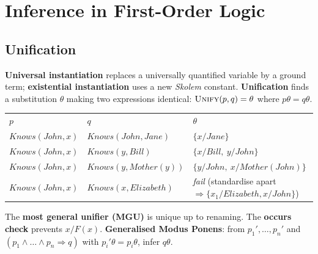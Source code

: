 \section{Inference in First-Order Logic}
\subsection{Unification}
\textbf{Universal instantiation} replaces a universally quantified variable by a ground term; \textbf{existential instantiation} uses a new \emph{Skolem} constant. \textbf{Unification} finds a substitution $\theta$ making two expressions identical: $\textsc{Unify}(p,q)=\theta$ where $p\theta=q\theta$.
\begin{center}\small
\begin{tabular}{lll}
\rowcolor{navy}\color{gold}$p$&\color{gold}$q$&\color{gold}$\theta$\\
$\textit{Knows}(John,x)$&$\textit{Knows}(John,Jane)$&$\{x/Jane\}$\\
\rowcolor{ivory}$\textit{Knows}(John,x)$&$\textit{Knows}(y,Bill)$&$\{x/Bill,\ y/John\}$\\
$\textit{Knows}(John,x)$&$\textit{Knows}(y,Mother(y))$&$\{y/John,\ x/Mother(John)\}$\\
\rowcolor{ivory}$\textit{Knows}(John,x)$&$\textit{Knows}(x,Elizabeth)$&\textit{fail} (standardise apart $\Rightarrow\{x_1/Elizabeth,x/John\}$)\\
\end{tabular}\end{center}
The \textbf{most general unifier (MGU)} is unique up to renaming. The \textbf{occurs check} prevents $x/F(x)$. \textbf{Generalised Modus Ponens}: from $p_1',\dots,p_n'$ and $(p_1\wedge\dots\wedge p_n\Rightarrow q)$ with $p_i'\theta=p_i\theta$, infer $q\theta$.

